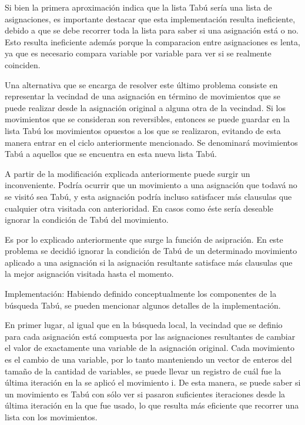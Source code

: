 \documentclass[a4paper,10pt]{article}
\begin{document}
Si bien la primera aproximaci\'on indica que la lista Tab\'u ser\'ia una lista de asignaciones, es importante destacar que esta implementaci\'on resulta ineficiente, debido a que se debe recorrer toda la lista para saber si una asignaci\'on est\'a o no. Esto resulta ineficiente adem\'as porque la comparacion entre asignaciones es lenta, ya que es necesario compara variable por variable para ver si se realmente coinciden.

Una alternativa que se encarga de resolver este \'ultimo problema consiste en representar la vecindad de una asignaci\'on en t\'ermino de movimientos que se puede realizar desde la asignaci\'on original a alguna otra de la vecindad. Si los movimientos que se consideran son reversibles, entonces se puede guardar en la lista Tab\'u los movimientos opuestos a los que se realizaron, evitando de esta manera entrar en el ciclo anteriormente mencionado. Se denominar\'a movimientos Tab\'u a aquellos que se encuentra en esta nueva lista Tab\'u.

A partir de la modificaci\'on explicada anteriormente puede surgir un inconveniente. Podr\'ia ocurrir que un movimiento a una asignaci\'on que todav\'a no se visit\'o sea Tab\'u, y esta asignaci\'on podr\'ia incluso satisfacer m\'as clausulas que cualquier otra visitada con anterioridad. En casos como \'este ser\'ia deseable ignorar la condici\'on de Tab\'u del movimiento. 

Es por lo explicado anteriormente que surge la funci\'on de asipraci\'on. En este problema se decidi\'o ignorar la condici\'on de Tab\'u de un determinado movimiento aplicado a una asignaci\'on si la asignaci\'on resultante satisface m\'as clausulas que la mejor asignaci\'on visitada hasta el momento.


Implementaci\'on:
Habiendo definido conceptualmente los componentes de la b\'usqueda Tab\'u, se pueden mencionar algunos detalles de la implementaci\'on.

En primer lugar, al igual que en la b\'usqueda local, la vecindad que se definio para cada asignaci\'on est\'a compuesta por las asignaciones resultantes de cambiar el valor de exactamente una variable de la asignaci\'on original. Cada movimiento es el cambio de una variable, por lo tanto manteniendo un vector de enteros del tama\~{n}o de la cantidad de variables, se puede llevar un registro de cu\'al fue la \'ultima iteraci\'on en la se aplic\'o el movimiento i. De esta manera, se puede saber si un movimiento es Tab\'u con s\'olo ver si pasaron suficientes iteraciones desde la \'ultima iteraci\'on en la que fue usado, lo que resulta m\'as eficiente que recorrer una lista con los movimientos.
\end{document}
